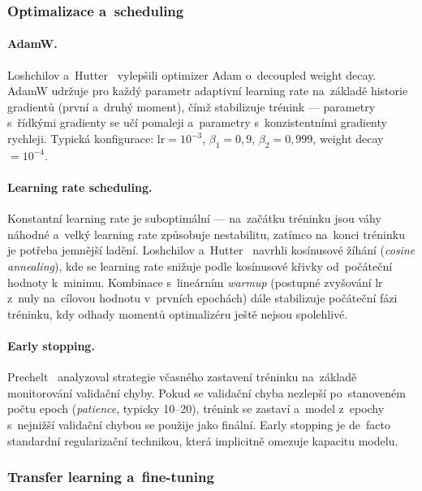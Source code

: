 \subsubsection{Optimalizace a~scheduling}
\label{subsubsec:optimalizace}

\paragraph{AdamW.}
Loshchilov a~Hutter~\cite{loshchilov2019adamw} vylepšili optimizer Adam o~decoupled weight decay. AdamW udržuje pro každý parametr adaptivní learning rate na~základě historie gradientů (první a~druhý moment), čímž stabilizuje trénink --- parametry s~řídkými gradienty se učí pomaleji a~parametry s~konzistentními gradienty rychleji. Typická konfigurace: $\mathrm{lr} = 10^{-3}$, $\beta_1 = 0{,}9$, $\beta_2 = 0{,}999$, weight decay $= 10^{-4}$.

\paragraph{Learning rate scheduling.}
Konstantní learning rate je suboptimální --- na~začátku tréninku jsou váhy náhodné a~velký learning rate způsobuje nestabilitu, zatímco na~konci tréninku je potřeba jemnější ladění. Loshchilov a~Hutter~\cite{loshchilov2017sgdr} navrhli kosínusové žíhání (\textit{cosine annealing}), kde se learning rate snižuje podle kosínusové křivky od~počáteční hodnoty k~minimu. Kombinace s~lineárním \textit{warmup} (postupné zvyšování lr z~nuly na~cílovou hodnotu v~prvních epochách) dále stabilizuje počáteční fázi tréninku, kdy odhady momentů optimalizéru ještě nejsou spolehlivé.

\paragraph{Early stopping.}
Prechelt~\cite{prechelt1998earlystopping} analyzoval strategie včasného zastavení tréninku na~základě monitorování validační chyby. Pokud se validační chyba nezlepší po~stanoveném počtu epoch (\textit{patience}, typicky 10--20), trénink se zastaví a~model z~epochy s~nejnižší validační chybou se použije jako finální. Early stopping je de~facto standardní regularizační technikou, která implicitně omezuje kapacitu modelu.

\subsubsection{Transfer learning a~fine-tuning}
\label{subsubsec:transfer_learning}

